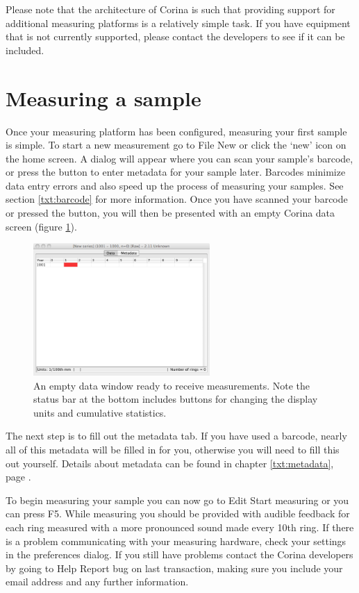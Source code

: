 Please note that the architecture of Corina is such that providing support for additional measuring platforms is a relatively simple task.  If you have equipment that is not currently supported, please contact the developers to see if it can be included.  


\section{Measuring a sample}

Once your measuring platform has been configured, measuring your first sample is simple.  To start a new measurement go to File \MVRightarrow New or click the `new' icon on the home screen. A dialog will appear where you can scan your sample's barcode, or press the button to enter metadata for your sample later. Barcodes minimize data entry errors and also speed up the process of measuring your samples. See section \ref{txt:barcode} for more information. Once you have scanned your barcode or pressed the button, you will then be presented with an empty Corina data screen (figure \ref{fig:datascreen}).

\begin{figure}[hbtp]
  \centering
    \includegraphics[width=0.6\textwidth]{Images/datascreen.png}
    \caption{An empty data window ready to receive measurements.  Note the status bar at the bottom includes buttons for changing the display units and cumulative statistics.}
    \label{fig:datascreen}
\end{figure}

The next step is to fill out the metadata tab. If you have used a barcode, nearly all of this metadata will be filled in for you, otherwise you will need to fill this out yourself. Details about metadata can be found in chapter \ref{txt:metadata}, page \pageref{txt:metadata}.

To begin measuring your sample you can now go to Edit \MVRightarrow Start measuring or you can press F5. While measuring you should be provided with audible feedback for each ring measured with a more pronounced sound made every 10th ring. If there is a problem communicating with your measuring hardware, check your settings in the preferences dialog. If you still have problems contact the Corina developers by going to Help \MVRightarrow Report bug on last transaction, making sure you include your email address and any further information.

